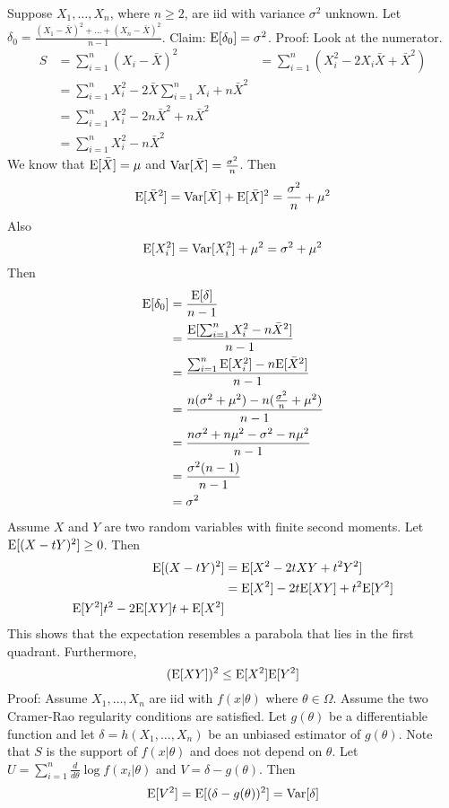 \documentclass[12pt]{article}
\begin{document}
Suppose $X_1,\dots,X_n$, where $n\geq 2$, are iid with variance $\sigma^2$ unknown. Let $\delta_0 = \frac{(X_1-\bar{X})^2 + \dots + (X_n - \bar{X})^2}{n-1}$. Claim: $\mathrm{E}[ \delta_0 ] = \sigma^2$. Proof: Look at the numerator. $$ \begin{aligned} S &= \sum_{i=1}^n (X_i - \bar{X})^2 &= \sum_{i=1}^n (X_i^2 - 2X_i\bar{X} + \bar{X}^2) \\ &= \sum_{i=1}^n X_i^2 - 2\bar{X}\sum_{i=1}^n X_i + n\bar{X}^2 \\ &= \sum_{i=1}^n X_i^2 -2n\bar{X}^2 + n\bar{X}^2 \\ &= \sum_{i=1}^n X_i^2 - n\bar{X}^2 \end{aligned} $$ We know that $\mathrm{E}[ \bar{X} ] = \mu$ and $\mathrm{Var}[ \bar{X} ] = \frac{\sigma^2}{n}$. Then $$ \mathrm{E}[ \bar{X}^2 ] = \mathrm{Var}[ \bar{X} ] + \mathrm{E}[ \bar{X} ]^2 = \frac{\sigma^2}{n} + \mu^2 $$ Also $$ \mathrm{E}[ X_i^2 ] = \mathrm{Var}[ X_i^2 ] + \mu^2 = \sigma^2 + \mu^2 $$ Then $$ \begin{aligned} \mathrm{E}[ \delta_0 ] &= \frac{\mathrm{E}[ \delta ]}{n-1} \\ &= \frac{ \mathrm{E}[ \sum_{i=1}^n X_i^2 - n\bar{X}^2 ]}{n-1} \\ &= \frac{\sum_{i=1}^n \mathrm{E}[ X_i^2 ] - n\mathrm{E}[ \bar{X}^2 ]}{n-1} \\ &= \frac{n(\sigma^2 + \mu^2) - n(\frac{\sigma^2}{n} + \mu^2)}{n-1} \\ &= \frac{n\sigma^2 + n\mu^2 - \sigma^2 - n\mu^2}{n-1} \\ &= \frac{\sigma^2(n-1)}{n-1} \\ &= \sigma^2 \end{aligned} $$ 
Assume $X$ and $Y$ are two random variables with finite second moments. Let $\mathrm{E}[ (X-tY)^2 ] \geq 0$. Then $$ \begin{aligned} \mathrm{E}[ (X-tY)^2 ] &= \mathrm{E}[ X^2 - 2tXY + t^2Y^2 ] \\ &= \mathrm{E}[ X^2 ] - 2t\mathrm{E}[ XY ] + t^2\mathrm{E}[ Y^2 ] \\ \mathrm{E}[ Y^2 ]t^2 - 2\mathrm{E}[ XY ]t + \mathrm{E}[ X^2 ] \end{aligned} $$ This shows that the expectation resembles a parabola that lies in the first quadrant. Furthermore, $$ (\mathrm{E}[ XY ])^2 \leq \mathrm{E}[ X^2 ] \mathrm{E}[ Y^2 ] $$ 
Proof: Assume $X_1,\dots,X_n$ are iid with $f(x|\theta)$ where $\theta \in \Omega$. Assume the two Cramer-Rao regularity conditions are satisfied. Let $g(\theta)$ be a differentiable function and let $\delta = h(X_1,\dots,X_n)$ be an unbiased estimator of $g(\theta)$. Note that $S$ is the support of $f(x|\theta)$ and does not depend on $\theta$. Let $U = \sum_{i=1}^n \frac{d}{d\theta} \log f(x_i | \theta) $ and $V = \delta - g(\theta)$. Then $$ \mathrm{E}[ V^2 ] = \mathrm{E}[ (\delta - g(\theta))^2 ] = \mathrm{Var}[ \delta ]$$ 
\end{document}
